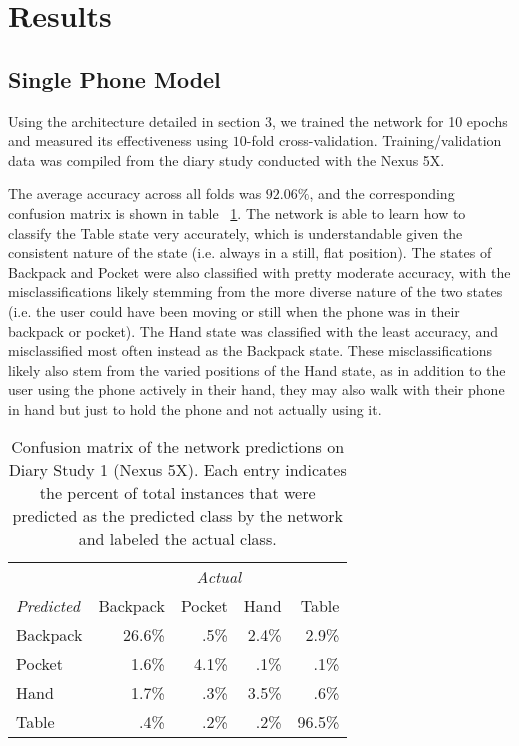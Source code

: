 \section{Results}
\subsection{Single Phone Model}
Using the architecture detailed in section 3, we trained the network for 10 epochs
and measured its effectiveness using $10$-fold cross-validation.
Training/validation data was compiled from the diary study conducted with the Nexus 5X.

The average accuracy across all folds was $92.06\%$, and the corresponding
confusion matrix is shown in table ~\ref{fig:confusion1}. The network is able to learn how to 
classify the Table state very accurately, which is understandable given 
the consistent nature of the state (i.e. always in a still, flat position). The states
of Backpack and Pocket were also classified with pretty moderate accuracy,
with the misclassifications likely stemming from the more diverse nature of 
the two states (i.e. the user could have been moving or still when the phone was
in their backpack or pocket). The Hand state was classified with the least accuracy,
and misclassified most often instead as the Backpack state. These misclassifications
likely also stem from the varied positions of the Hand state, as in addition to the user
using the phone actively in their hand, they may also walk with their phone in hand
but just to hold the phone and not actually using it.

\begin{table}[h]
\caption{Confusion matrix of the network predictions on Diary Study 1 (Nexus 5X). Each entry indicates the percent of
total instances that were predicted as the predicted class by the network and labeled the actual class.}\label{fig:confusion1} \centering
\begin{tabular}{ l rrrr }  
\toprule
      &  \multicolumn{4}{c}{\textit{Actual}} \\
\cmidrule{2-5}
\textit{Predicted}		&	Backpack    & 	Pocket 	& 	Hand	&	Table \\
\midrule
Backpack			&	26.6\% 	&	 .5\%		&	2.4\% 	&	2.9\% \\
Pocket			&	1.6\% 	&	4.1\% 	&	 .1\% 	&	 .1\% \\
Hand			&	1.7\% 	&	 .3\% 	&	3.5\% 	&	 .6\% \\
Table			&	 .4\% 	&	 .2\% 	&	 .2\% 	&	96.5\%\\
\bottomrule
\end{tabular}
\end{table}



